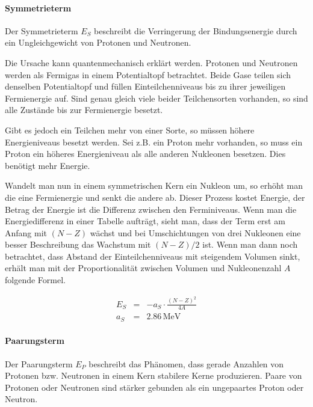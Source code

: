 \documentclass[12pt,a4paper]{scrartcl}
\numberwithin{equation}{section} %
\begin{document}
\hypertarget{symmetrieterm}{%
\paragraph{Symmetrieterm}\label{symmetrieterm}}

Der Symmetrieterm $E_S$ beschreibt die Verringerung der Bindungsenergie durch ein Ungleichgewicht von Protonen und Neutronen.

Die Ursache kann quantenmechanisch erklärt werden. Protonen und Neutronen werden als Fermigas in einem Potentialtopf betrachtet. Beide Gase teilen sich denselben Potentialtopf und füllen Einteilchenniveaus bis zu ihrer jeweiligen Fermienergie auf. Sind genau gleich viele beider Teilchensorten vorhanden, so sind alle Zustände bis zur Fermienergie besetzt.

Gibt es jedoch ein Teilchen mehr von einer Sorte, so müssen höhere Energieniveaus besetzt werden. Sei z.B. ein Proton mehr vorhanden, so muss ein Proton ein höheres Energieniveau als alle anderen Nukleonen besetzen. Dies benötigt mehr Energie.

Wandelt man nun in einem symmetrischen Kern ein Nukleon um, so erhöht man die eine Fermienergie und senkt die andere ab. Dieser Prozess kostet Energie, der Betrag der Energie ist die Differenz zwischen den Ferminiveaus. Wenn man die Energiedifferenz in einer Tabelle aufträgt, sieht man, dass der Term erst am Anfang mit $(N-Z)$ wächst und bei Umschichtungen von drei Nukleonen eine besser Beschreibung das Wachstum mit $(N-Z)/2$ ist. Wenn man dann noch betrachtet, dass Abstand der Einteilchenniveaus mit steigendem Volumen sinkt, erhält man mit der Proportionalität zwischen Volumen und Nukleonenzahl $A$ folgende Formel.

\begin{eqnarray}
    E_S &=& - a_S\cdot \frac{(N-Z)^2}{4A} \label{Symmetrieterm} \\
    a_S &=& 2.86\mathrm{\,MeV}
\end{eqnarray}

\hypertarget{paarungsterm}{%
\paragraph{Paarungsterm}\label{paarungsterm}}

Der Paarungsterm $E_P$ beschreibt das Phänomen, dass gerade Anzahlen von Protonen bzw. Neutronen in einem Kern stabilere Kerne produzieren. Paare von Protonen oder Neutronen sind stärker gebunden als ein ungepaartes Proton oder Neutron.
\end{document}
